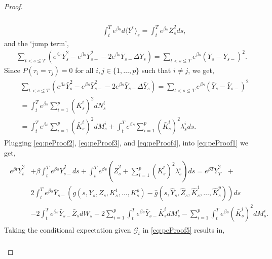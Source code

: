 \documentclass[11pt,a4paper]{article}
\numberwithin{equation}{section}
\theoremstyle{newPlain}
\theoremstyle{newDefinition}
\theoremstyle{newRemark}
\begin{document}
{\begin{proof}
\begin{align}
\begin{aligned}
        \end{aligned}\\
        \label{eq:peProof3}
        &\quad\quad\int_t^Te^{\beta s}d\langle\bar{Y}^c\rangle_s = \int_t^Te^{\beta s}\bar{Z}_s^2ds,
    \end{align}
    and the `jump term',
    \begin{align*}
        \sum_{t<s\le T}\left(e^{\beta s}\bar{Y}_s^2-e^{\beta s}\bar{Y}_{s-}^2 - 2e^{\beta s}\bar{Y}_{s-}\Delta\bar{Y}_s\right) = \sum_{t<s\le T}e^{\beta s}(\bar{Y}_s - \bar{Y}_{s-})^2.
    \end{align*}
    Since $P(\tau_i = \tau_j) = 0$ for all $i,j\in\{1,\ldots,p\}$ such that $i\ne j$, we get,
    \begin{align}\label{eq:peProof4}
        \begin{aligned}
            &\sum_{t<s\le T}(e^{\beta s}\bar{Y}_s^2-e^{\beta s}\bar{Y}_{s-}^2 - 2e^{\beta s}\bar{Y}_{s-}\Delta\bar{Y}_s) = \sum_{t<s\le T}e^{\beta s}(\bar{Y}_s - \bar{Y}_{s-})^2\\
	      &= \int_t^Te^{\beta s}\sum_{i=1}^p(\bar{K}_s^i)^2dN_s^i\\
            &= \int_t^Te^{\beta s}\sum_{i=1}^p(\bar{K}_s^i)^2dM_s^i + \int_t^Te^{\beta s}\sum_{i=1}^p(\bar{K}_s^i)^2\lambda_s^ids.
        \end{aligned}
    \end{align}
    Plugging \eqref{eq:peProof2}, \eqref{eq:peProof3}, and \eqref{eq:peProof4}, into \eqref{eq:peProof1} we get,
    \begin{align}\label{eq:peProof5}
        \begin{aligned}
            e^{\beta t}\bar{Y}_t^2 &+ \beta\int_t^Te^{\beta s}\bar{Y}_{s-}^2ds + \int_t^Te^{\beta s}\left(\bar{Z}_s^2+\sum_{i=1}^p(\bar{K}_s^i)^2\lambda_s^i\right)ds = e^{\beta T}\bar{Y}_T^2\text{ }+\\ &2\int_t^Te^{\beta s}\bar{Y}_{s-}(g(s,Y_s,Z_s,K_s^1,\ldots,K_s^p) - \hat{g}(s,\hat{Y}_s,\hat{Z}_s,\hat{K}_s^1,\ldots,\hat{K}_s^p))ds\\
            &- 2\int_t^Te^{\beta s}\bar{Y}_{s-}\bar{Z}_sdW_s -2 \sum_{i=1}^p\int_t^Te^{\beta s}\bar{Y}_{s-}\bar{K}_s^idM_s^i-\sum_{i=1}^p\int_t^Te^{\beta s}(\bar{K}_s^i)^2dM_s^i.
        \end{aligned}
    \end{align}
    Taking the conditional expectation given $\mathcal{G}_t$ in \eqref{eq:peProof5} results in,
    \begin{align}\label{eq:interm99}
	\begin{aligned}

\end{aligned}
\end{align}
\end{proof}}
\end{document}
